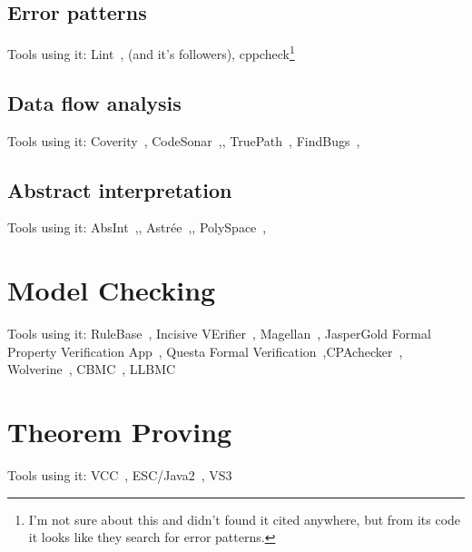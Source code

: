 \subsection{Error patterns}
Tools using it: Lint~\cite{KrenaVojnarOverview}, (and it's followers), cppcheck\footnote{I'm not sure about this and didn't found it cited anywhere, but from its code it looks like they search for error patterns.}

\subsection{Data flow analysis}
Tools using it: Coverity~\cite{KrenaVojnarOverview}, CodeSonar~\cite{KrenaVojnarOverview},, TruePath~\cite{KrenaVojnarOverview}, FindBugs~\cite{KrenaVojnarOverview},

\subsection{Abstract interpretation}
Tools using it: AbsInt~\cite{KrenaVojnarOverview},, Astrée~\cite{Astree1,KrenaVojnarOverview},, PolySpace~\cite{KrenaVojnarOverview},

\section{Model Checking}\label{chap:fav:modelChecking}
Tools using it: RuleBase~\cite{KrenaVojnarOverview}, Incisive VErifier~\cite{KrenaVojnarOverview}, Magellan~\cite{KrenaVojnarOverview}, JasperGold Formal Property Verification App~\cite{KrenaVojnarOverview}, Questa Formal Verification~\cite{KrenaVojnarOverview},CPAchecker~\cite{KrenaVojnarOverview}, Wolverine~\cite{KrenaVojnarOverview}, CBMC~\cite{KrenaVojnarOverview}, LLBMC~\cite{KrenaVojnarOverview}


\section{Theorem Proving}\label{chap:fav:theoremProving}
Tools using it: VCC~\cite{KrenaVojnarOverview}, ESC/Java2~\cite{KrenaVojnarOverview}, VS3~\cite{KrenaVojnarOverview}


